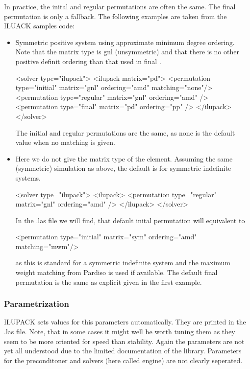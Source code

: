 In practice, the inital and regular permutations are often the same. The final
permutation is only a fallback. The following examples are taken from the ILUACK
samples code:

\begin{itemize}
\item Symmetric positive system using approximate minimum degree ordering. Note
that the matrix type is gnl (unsymmetric) and that there is no other positive
definit ordering than that used in final .
\begin{xmllisting}
<solver type="ilupack">
  <ilupack matrix="pd">
     <permutation type="initial" matrix="gnl" ordering="amd" matching="none"/>
     <permutation type="regular" matrix="gnl" ordering="amd" />
     <permutation type="final"   matrix="pd"  ordering="pp" /> 
  </ilupack> 
</solver>
\end{xmllisting}
The initial and regular permutations are the same, as none is the default value
when no matching is given. 

\item Here we do not give the matrix type of the  element.
Assuming the same
(symmetric) simulation as above, the default is  for symmetric
indefinite systems. 
\begin{xmllisting}
<solver type="ilupack">
  <ilupack>
     <permutation type="regular" matrix="gnl" ordering="amd" />
  </ilupack> 
</solver>
\end{xmllisting}
In the .las file we will find, that default inital permutation will equivalent
to
\begin{xmllisting}
<permutation type="initial" matrix="sym" ordering="amd" matching="mwm"/>
\end{xmllisting}
as this is standard for a symmetric indefinite system and the maximum weight
matching from Pardiso is used if available. The default final permutation is the
same as explicit given in the first example.
\end{itemize}


\subsubsection*{Parametrization}
ILUPACK sets values for this parameters automatically. They are printed in the
.las file. Note, that in some cases it might well be worth tuning them as they
seem to be more oriented for speed than stability. Again the parameters are not
yet all understood due to the limited documentation of the library. Parameters
for the preconditoner and solvers (here called engine) are not clearly
seperated.

